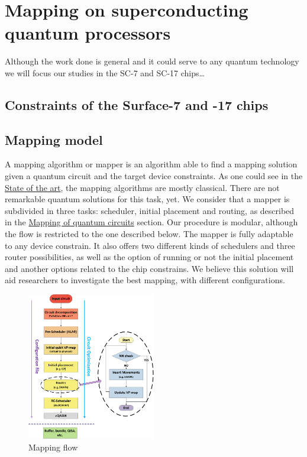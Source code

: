 
\chapter*{Mapping on superconducting quantum processors}
\label{sec:org9eb8d6b}
Although the work done is general and it could serve to any quantum technology we will focus our studies in the SC-7 and SC-17 chips\ldots{}
\section*{Constraints of the Surface-7 and -17 chips}
\label{sec:orgef1c9f3}


\section*{Mapping model}
\label{sec:org2a0d454}
A mapping algorithm or mapper is an algorithm able to find a mapping solution given a quantum circuit and the target device constraints.
As one could see in the \href{chapter-2.org}{State of the art}, the mapping algorithms are mostly classical.
There are not remarkable quantum solutions for this task, yet.
We consider that a mapper is subdivided in three tasks: scheduler, initial placement and routing, as described in the \href{chapter-2.org}{Mapping of quantum circuits} section.
Our procedure is modular, although the flow is restricted to the one described below.
The mapper is fully adaptable to any device constrain.
It also offers two different kinds of schedulers and three router possibilities, as well as the option of running or not the initial placement and another options related to the chip constrains.
We believe this solution will aid researchers to investigate the best mapping, with different configurations.

\begin{figure}[htbp]
\centering
\includegraphics[width=0.5\textwidth]{figures/mapping_flow2.png}
\caption{\label{fig:orga86638e}
Mapping flow}
\end{figure}

